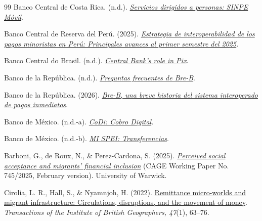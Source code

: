 \begin{thebibliography}{99}
Banco Central de Costa Rica. (n.d.). \href{https://www.bccr.fi.cr/cr/es/sistema-de-pagos/servicios-sinpe/servicios-dirigidos-a-personas.html}{\emph{Servicios dirigidos a personas: SINPE Móvil}}.

Banco Central de Reserva del Perú. (2025). \href{https://www.bcrp.gob.pe/docs/Sistema-Pagos/articulos/estrategia-de-interoperabilidad-2025-1.pdf}{\emph{Estrategia de interoperabilidad de los pagos minoristas en Perú: Principales avances al primer semestre del 2025}}.

Banco Central do Brasil. (n.d.). \href{https://www.bcb.gov.br/en/financialstability/pixcentralbanksrole}{\emph{Central Bank's role in Pix}}.

Banco de la República. (n.d.). \href{https://www.banrep.gov.co/es/bre-b/preguntas-frecuentes}{\emph{Preguntas frecuentes de Bre-B}}.

Banco de la República. (2026). \href{https://www.banrep.gov.co/es/blog/bre-b-breve-historia-sistema-interoperado-pagos-inmediatos}{\emph{Bre-B, una breve historia del sistema interoperado de pagos inmediatos}}.

Banco de México. (n.d.-a). \href{https://www.banxico.org.mx/sistemas-de-pago/codi-cobro-digital-banco-me.html}{\emph{CoDi: Cobro Digital}}.

Banco de México. (n.d.-b). \href{https://www.banxico.org.mx/servicios/mi-spei_-transferencias-ban.html}{\emph{MI SPEI: Transferencias}}.

Barboni, G., de Roux, N., \& Perez-Cardona, S. (2025). \href{https://warwick.ac.uk/fac/soc/economics/research/centres/cage/manage/publications/wp745.2025.pdf}{\emph{Perceived social acceptance and migrants' financial inclusion}} (CAGE Working Paper No. 745/2025, February version). University of Warwick.

Cirolia, L. R., Hall, S., \& Nyamnjoh, H. (2022). \href{https://doi.org/10.1111/tran.12467}{Remittance micro-worlds and migrant infrastructure: Circulations, disruptions, and the movement of money}. \emph{Transactions of the Institute of British Geographers, 47}(1), 63--76.


\end{thebibliography}
